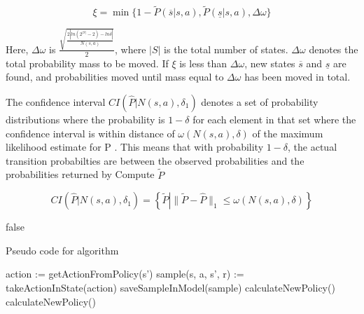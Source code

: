 \begin{equation}
\label{equation:xi}
\xi = \min\{
  1 - \tilde{P}(\overline{s} | s, a)
  , \tilde{P}(\underline{s} | s, a)
  , \Delta \omega 
\}
\end{equation}

Here, $\Delta \omega$ is $\frac{\sqrt{\frac{2|ln(2^{|S|}-2) - ln  \delta |}{N(s,a)}}}{2}$, where $|S|$ is the total number of states. $\Delta \omega$ denotes the total probability mass to be moved. If $\xi$ is less than $\Delta \omega$, new states $\overline{s}$ and $\underline{s}$ are found, and probabilities moved until mass equal to $\Delta \omega$ has been moved in total. 

The confidence interval $CI(\hat{P} | N(s, a), \delta_1)$ denotes a set of probability distributions where the probability is $1 - \delta$ for each element in that set where the confidence interval is within distance of $\omega(N(s,a),\delta)$ of the maximum likelihood estimate for P \parencite{dietterich2013pac}. This means that with probability $1-\delta$, the actual transition probabilties are between the observed probabilities and the probabilities returned by Compute $\tilde{P}$   

\begin{equation}
\label{equation:balls_of_steels}
CI(\hat{P} | N(s, a), \delta_1)  = \left\{\tilde{P} \left| \|\tilde{P} - \hat{P}\|_1 \le \omega(N(s,a), \delta)\right.\right\}
\end{equation}





\label{goto}


\ifx false
\label{sec:agent:step}
\begin{algorithm}      
\caption{Pseudo code for algorithm}          
\begin{algorithmic}
\Loop
\State action := getActionFromPolicy(s')
\State sample(s, a, s', r) := takeActionInState(action) 
\State saveSampleInModel(sample)
\State calculateNewPolicy()
\EndIf
{}
\State calculateNewPolicy()
\EndIf
\EndLoop
\end{algorithmic}
\end{algorithm}
\fi


